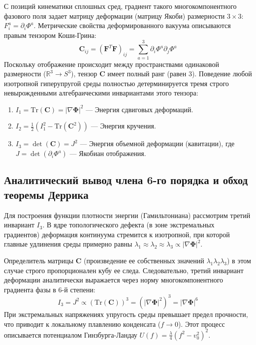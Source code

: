 \documentclass[12pt,a4paper]{article}
\begin{document}
С позиций кинематики сплошных сред, градиент такого многокомпонентного фазового поля задает матрицу деформации (матрицу Якоби) размерности $3 \times 3$: $F_{i}^a = \partial_i \Phi^a$. Метрические свойства деформированного вакуума описываются правым тензором Коши-Грина:
\begin{equation}
	\mathbf{C}_{ij} = (\mathbf{F}^T \mathbf{F})_{ij} = \sum_{a=1}^3 \partial_i \Phi^a \partial_j \Phi^a
\end{equation}
Поскольку отображение происходит между пространствами одинаковой размерности ($\mathbb{R}^3 \to S^3$), тензор $\mathbf{C}$ имеет полный ранг (равен 3). Поведение любой изотропной гиперупругой среды полностью детерминируется тремя строго невырожденными алгебраическими инвариантами этого тензора:
\begin{enumerate}
	\item $I_1 = \text{Tr}(\mathbf{C}) = |\nabla \boldsymbol{\Phi}|^2$ — Энергия сдвиговых деформаций.
	\item $I_2 = \frac{1}{2} (I_1^2 - \text{Tr}(\mathbf{C}^2))$ — Энергия кручения.
	\item $I_3 = \det(\mathbf{C}) = J^2$ — Энергия объемной деформации (кавитации), где $J = \det(\partial_i \Phi^a)$ — Якобиан отображения.
\end{enumerate}

\subsection{Аналитический вывод члена 6-го порядка и обход теоремы Деррика}
Для построения функции плотности энергии (Гамильтониана) рассмотрим третий инвариант $I_3$. В ядре топологического дефекта (в зоне экстремальных градиентов) деформация континуума стремится к изотропной, при которой главные удлинения среды примерно равны $\lambda_1 \approx \lambda_2 \approx \lambda_3 \propto |\nabla \boldsymbol{\Phi}|^2$. 

Определитель матрицы $\mathbf{C}$ (произведение ее собственных значений $\lambda_1 \lambda_2 \lambda_3$) в этом случае строго пропорционален кубу ее следа. Следовательно, третий инвариант деформации аналитически выражается через норму многокомпонентного градиента фазы в 6-й степени:
\begin{equation}
	I_3 = J^2 \propto \left( \text{Tr}(\mathbf{C}) \right)^3 = \left( |\nabla \boldsymbol{\Phi}|^2 \right)^3 = |\nabla \boldsymbol{\Phi}|^6
\end{equation}
При экстремальных напряжениях упругость среды превышает предел прочности, что приводит к локальному плавлению конденсата ($f \to 0$). Этот процесс описывается потенциалом Гинзбурга-Ландау $U(f) = \frac{\lambda}{4}(f^2 - v_0^2)^2$. 
\end{document}
